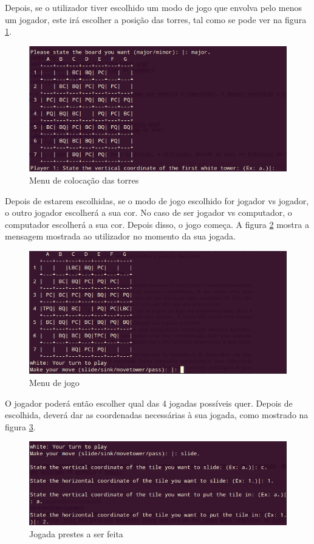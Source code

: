 \documentclass[a4paper]{article}
\begin{document}
Depois, se o utilizador tiver escolhido um modo de jogo que envolva pelo menos um jogador, este irá escolher a posição das torres, tal como se pode ver na figura \ref{fig:picktowers}.

\begin{figure}[h]
\centering
\includegraphics[scale=0.5]{picktower.png}
\caption{Menu de colocação das torres}
\label{fig:picktowers}
\end{figure}

Depois de estarem escolhidas, se o modo de jogo escolhido for jogador vs jogador, o outro jogador escolherá a sua cor. No caso de ser jogador vs computador, o computador escolherá a sua cor. Depois disso, o jogo começa. A figura \ref{fig:playtime} mostra a mensagem mostrada ao utilizador no momento da sua jogada.

\begin{figure}[h]
\centering
\includegraphics[scale=0.5]{playtime.png}
\caption{Menu de jogo}
\label{fig:playtime}
\end{figure}

O jogador poderá então escolher qual das 4 jogadas possíveis quer. Depois de escolhida, deverá dar as coordenadas necessárias à sua jogada, como mostrado na figura \ref{fig:playmade}.

\begin{figure}[h]
\centering
\includegraphics[scale=0.5]{playmade.png}
\caption{Jogada prestes a ser feita}
\label{fig:playmade}
\end{figure}
\end{document}
